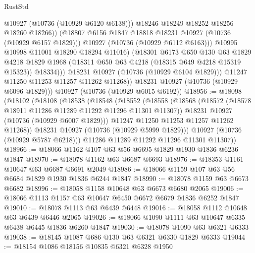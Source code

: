 \begin{lexlean}{RustStd}
\begin{coremodule}
                          @10927
                          (@10736 (@10929 @6120 @6138)))
                        @18246
                        @18249
                        @18252
                        @18256
                        @18260
                        @18266))
                    (@18807 @6156 @1847 @18818 @18231 @10927 (@10736 (@10929 @6157 @1829)))
                    @10927
                    (@10736 (@10929 @6112 @6163)))
                  @10995
                  @10998
                  @11001
                  @18290
                  @18294
                  @11016)
                (@18301
                  @6173
                  @650
                  @130
                  @63
                  @1829
                  @4218
                  @1829
                  @1968
                  (@18311 @650 @63 @4218 (@18315 @649 @4218 @15319 @15323))
                  @18334)))
            @18231
            @10927
            (@10736 (@10929 @6104 @1829)))
          @11247
          @11250
          @11253
          @11257
          @11262
          @11268))
      @18231
      @10927
      (@10736 (@10929 @6096 @1829)))
    @10927
    (@10736 (@10929 @6015 @6192))
@18956 := @18098
    (@18102
      (@18108
        (@18538
          (@18548
            (@18552
              (@18558
                (@18568
                  (@18572 (@18578 @18911 @11286 @11289 @11292 @11296 @11301 @11307))
                  @18231
                  @10927
                  (@10736 (@10929 @6007 @1829)))
                @11247
                @11250
                @11253
                @11257
                @11262
                @11268))
            @18231
            @10927
            (@10736 (@10929 @5999 @1829)))
          @10927
          (@10736 (@10929 @5787 @6218)))
        @11286
        @11289
        @11292
        @11296
        @11301
        @11307))
@18966 := @18066 @1162 @107 @63 @56 @6695 @1829 @1930 @1836 @6236 @1847
@18970 := @18078 @1162 @63 @6687 @6693
@18976 := @18353 @1161 @10647 @63 @6687 @6691 @2049
@18986 := @18066 @1159 @107 @63 @56 @6684 @1829 @1930 @1836 @6244 @1847
@18990 := @18078 @1159 @63 @6673 @6682
@18996 := @18058 @1158 @10648 @63 @6673 @6680 @2065
@19006 := @18066 @1113 @1157 @63 @10647 @6450 @6672 @6679 @1836 @6252 @1847
@19010 := @18078 @1113 @63 @6439 @6448
@19016 := @18058 @1112 @10648 @63 @6439 @6446 @2065
@19026 := @18066 @1090 @1111 @63 @10647 @6335 @6438 @6445 @1836 @6260 @1847
@19030 := @18078 @1090 @63 @6321 @6333
@19038 := @18145 @1087 @686 @130 @63 @6321 @6330 @1829 @6333
@19044 := @18154 @1086 @18156 @10835 @6321 @6328 @1950

\end{coremodule}
\end{lexlean}

